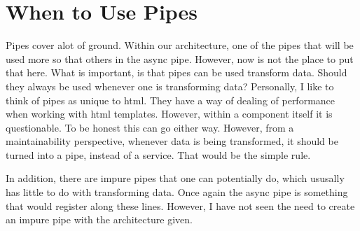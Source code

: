 \section{ When to Use Pipes }
Pipes cover alot of ground. Within our architecture, one of the pipes that will
be used more so that others in the async pipe. However, now is not the place
to put that here. What is important, is that pipes can be used transform data.
Should they always be used whenever one is transforming data? Personally,
I like to think of pipes as unique to html. They have a way of dealing of
performance when working with html templates. However, within a component
itself it is questionable. To be honest this can go either way. However, from a
maintainability perspective, whenever data is being transformed, it should be
turned into a pipe, instead of a service. That would be the simple rule.

In addition, there are impure pipes that one can potentially do, which ususally
has little to do with transforming data. Once again the async pipe is something
that would register along these lines. However, I have not seen the need to
create an impure pipe with the architecture given. 
